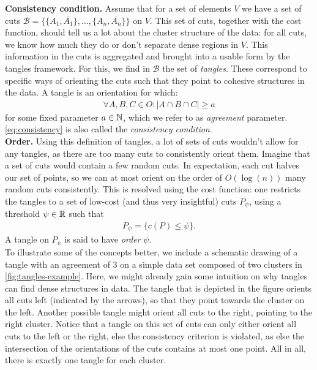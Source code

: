 \noindent
\textbf{Consistency condition.} Assume that for a set of elements $V$ we have a set of cuts $\mathcal{B} = \{\{A_1, \overline{A_1}\}, \ldots, \{A_n, \overline{A_n}\} \} $ on $V$.
This set of cuts, together with the cost function, should tell us a lot about the cluster structure of the data:
for all cuts, we know how much they do or don't separate dense regions in $V$. 
This information in the cuts is aggregated and brought into a usable form by the tangles framework. 
For this, we find in $\mathcal{B}$ the set of \textit{tangles}.  
These correspond to specific ways of orienting the cuts such that they point to cohesive structures in the data.  
A tangle is an orientation for which:
\begin{align}\label{eq:consistency}
    \forall A,B,C \in O: \left| A \cap B \cap C \right| \ge a
\end{align}
for some fixed parameter $a \in \mathbb{N}$, which we refer to as \textit{agreement} parameter. \autoref{eq:consistency} is also called the \textit{consistency condition}. \\

\noindent
\textbf{Order.} Using this definition of tangles, a lot of sets of cuts wouldn't allow for any tangles, as there are too many cuts to consistently orient them. 
Imagine that a set of cuts would contain a few random cuts. 
In expectation, each cut halves our set of points, so we can at most orient on the order of $O(\log(n))$ many random cuts consistently.
This is resolved using the cost function: one restricts the tangles to a set of low-cost (and thus very insightful) cuts $P_{\psi}$, using a threshold $\psi \in \mathbb{R}$ such that
\begin{align*}
P_{\psi} = \{ c(P) \le \psi \}   
.\end{align*}
A tangle on $P_{\psi}$ is said to have \textit{order} $\psi$. \\

\noindent
To illustrate some of the concepts better, we include a schematic drawing of a tangle with an agreement of $3$ on 
a simple data set composed of two clusters in \autoref{fig:tangles-example}. 
Here, we might already gain some intuition on why tangles can find dense structures in data. 
The tangle that is depicted in the figure orients all cuts left 
(indicated by the arrows), so that they point towards the cluster on the left. 
Another possible tangle might orient all cuts to the right, pointing to the right cluster. 
Notice that a tangle on this set of cuts can only either orient all cuts to the left or the 
right, else the consistency criterion is violated, as else the intersection of the orientations of the cuts contains at most one point. 
All in all, 
there is exactly one tangle for each cluster.


